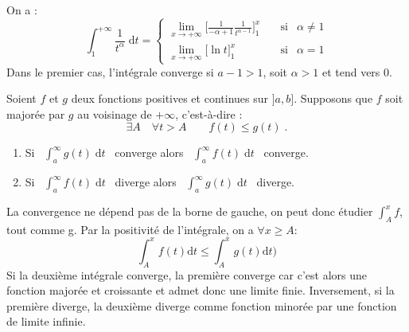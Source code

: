 \documentclass[french]{yLectureNote}
\newcommand{\dd}[0]{\mathrm{d}}
\begin{document}
\begin{myproof}
 On a : \[\int_1^{+\infty} \frac{1}{t^{\alpha}}\;\dd t =
\left\{
\begin{array}{lcl}
\displaystyle{\lim_{x\rightarrow+\infty}
\Big[\tfrac{1}{-\alpha+1}\frac{1}{t^{\alpha-1}}\Big]_1^x}
&\quad\text{si}&\alpha\neq 1\\[2ex]
\displaystyle{\lim_{x\rightarrow+\infty}
\Big[\ln t\Big]_1^x}
&\quad\text{si}&\alpha= 1
\end{array}
\right.\]
Dans le premier cas, l'intégrale converge si \(a-1>1\), soit \(\alpha>1\) et tend vers 0.
\end{myproof}

\begin{theorem}
Soient $f$ et $g$ deux fonctions positives et continues sur $]a,b]$.
Supposons que $f$ soit majorée par $g$ au voisinage de $+\infty$, c'est-à-dire :
$$\exists A \quad \forall t>A \qquad f(t)\le g(t)\;.$$
\begin{enumerate}
  \item Si \  $\int_a^{\infty} g(t)\;\dd t$ \  converge alors \  $\int_a^{\infty} f(t)\;\dd t$ \  converge.
  \item Si \  $\int_a^{\infty} f(t)\;\dd t$ \  diverge alors \  $\int_a^{\infty} g(t)\;\dd t$ \  diverge.
\end{enumerate}
\end{theorem}
\begin{myproof}
La convergence ne dépend pas de la borne de gauche, on peut donc étudier \(\int^x_A f\), tout comme g. Par la positivité de l'intégrale, on a \(\forall x\geq A\):
\[\int^x_A f(t)\dd t \leq \int_A^x g(t)\dd t)\]
Si la deuxième intégrale converge, la première converge car c'est alors une fonction majorée et croissante et admet donc une limite finie. Inversement, si la première diverge, la deuxième diverge comme fonction minorée par une fonction de limite infinie.
\end{myproof}
\end{document}
